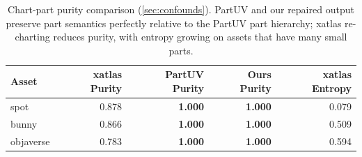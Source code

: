 \begin{table}[t]
\centering
\caption{Chart-part purity comparison (\cref{sec:confounds}). PartUV and our repaired output preserve part semantics perfectly relative to the PartUV part hierarchy; xatlas re-charting reduces purity, with entropy growing on assets that have many small parts.}
\label{tab:purity}
\begin{tabular}{@{}lrrrr@{}}
\toprule
Asset & xatlas Purity & PartUV Purity & Ours Purity & xatlas Entropy \\
\midrule
spot & 0.878 & \textbf{1.000} & \textbf{1.000} & 0.079 \\
bunny & 0.866 & \textbf{1.000} & \textbf{1.000} & 0.509 \\
objaverse & 0.783 & \textbf{1.000} & \textbf{1.000} & 0.594 \\
\bottomrule
\end{tabular}
\end{table}
